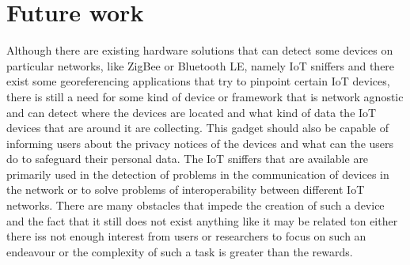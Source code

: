 %
%

\section{Future work}

Although there are existing hardware solutions that can detect some devices
on particular networks, like ZigBee or Bluetooth LE, namely IoT sniffers
and there exist some georeferencing applications that try to pinpoint certain
IoT devices, there is still a need for some kind of device or framework
that is network agnostic and can detect where the devices are located and
what kind of data the IoT devices that are around it are collecting. This
gadget should also be capable of informing users about the privacy notices
of the devices and what can the users do to safeguard their personal data.
The IoT sniffers that are available are primarily used in the detection
of problems in the communication of devices in the network or to solve problems
of interoperability between different IoT networks. There are many obstacles
that impede the creation of such a device and the fact that it still does
not exist anything like it may be related ton either there iss not enough
interest from users or researchers to focus on such an endeavour or the
complexity of such a task is greater than the rewards.
